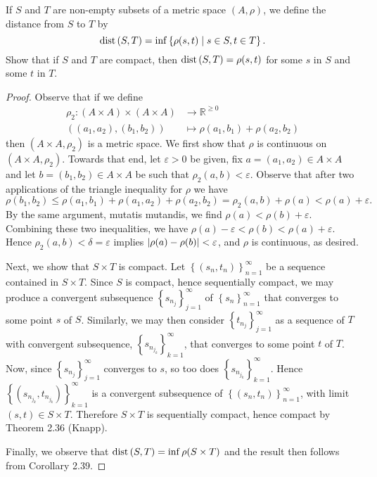 \documentclass[10pt]{amsart}
\begin{document}
\begin{ex3}
  If $S$ and $T$ are non-empty subsets of a metric space $(A,\rho)$, we define the distance from $S$ to $T$ by
  $$ \operatorname{dist}\left(S,T\right) = \inf \left\{\rho(s,t) \;\middle\vert\; s \in S, t \in T\right\}.$$
  Show that if $S$ and $T$ are compact, then $\operatorname{dist}\left(S,T\right) = \rho(s,t)$ for some $s$ in $S$ and some $t$ in $T$.

  \begin{proof}
    Observe that if we define 
    \begin{align*}
      \rho_2: \left(A \times A\right) \times \left(A \times A\right) &\rightarrow \mathbb{R}^{\geq 0}\\
      ((a_1, a_2), (b_1, b_2)) &\mapsto \rho(a_1, b_1) + \rho(a_2, b_2)
    \end{align*}
    then $(A \times A, \rho_2)$ is a metric space.
    We first show that $\rho$ is continuous on $(A \times A, \rho_2)$.
    Towards that end, let $\varepsilon > 0$ be given, fix $a = (a_1, a_2) \in A \times A$ and let $b = (b_1,b_2) \in A \times A$ be such that $\rho_2(a,b) < \varepsilon$.
    Observe that after two applications of the triangle inequality for $\rho$ we have 
    $$\rho(b_1, b_2) \leq \rho(a_1, b_1) + \rho(a_1, a_2) + \rho(a_2, b_2) = \rho_2(a,b) + \rho(a) < \rho(a) + \varepsilon.$$
    By the same argument, mutatis mutandis, we find $\rho(a) < \rho(b) + \varepsilon$.
    Combining these two inequalities, we have $\rho(a) - \varepsilon < \rho(b) < \rho(a) + \varepsilon$.
    Hence $\rho_2(a,b) < \delta = \varepsilon$ implies $\left| \rho(a) - \rho(b) \right| < \varepsilon$, and $\rho$ is continuous, as desired.
    
    Next, we show that $S \times T$ is compact.
    Let $\left\{ \left(s_n, t_n\right) \right\}_{n=1}^{\infty}$ be a sequence contained in $S \times T$.
    Since $S$ is compact, hence sequentially compact, we may produce a convergent subsequence $\left\{s_{n_j}\right\}_{j=1}^{\infty}$ of $\left\{s_n\right\}_{n=1}^{\infty}$ that converges to some point $s$ of $S$.
    Similarly, we may then consider $\left\{t_{n_j}\right\}_{j=1}^{\infty}$ as a sequence of $T$ with convergent subsequence, $\left\{s_{n_{j_k}}\right\}_{k=1}^{\infty}$, that converges to some point $t$ of $T$.
    Now, since $\left\{s_{n_j}\right\}_{j=1}^{\infty}$ converges to $s$, so too does $\left\{s_{n_{j_k}}\right\}_{k=1}^{\infty}$.
    Hence $\left\{ \left(s_{n_{j_k}}, t_{n_{j_k}}\right) \right\}_{k=1}^{\infty}$ is a convergent subsequence of $\left\{ \left(s_n, t_n\right) \right\}_{n=1}^{\infty}$, with limit $(s,t) \in S \times T$.
    Therefore $S \times T$ is sequentially compact, hence compact by Theorem 2.36 (Knapp).
    
    Finally, we observe that $\operatorname{dist}\left(S,T\right) = \inf \rho(S \times T)$ and the result then follows from Corollary 2.39.
  \end{proof}
\end{ex3}
\end{document}
